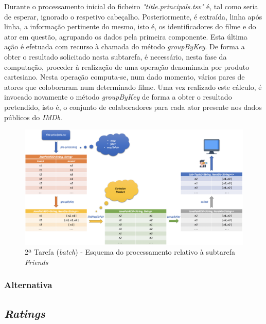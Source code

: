 \documentclass[a4paper]{report}
\begin{document}
            Durante o processamento inicial do ficheiro \textsl{"title.principals.tsv"} é, tal como seria de esperar, ignorado o respetivo cabeçalho.
            Posteriormente, é extraída, linha após linha, a informação pertinente do mesmo, isto é, os identificadores do filme e do ator em questão, agrupando os dados pela primeira componente. Esta última ação é efetuada com recurso à chamada do método \textit{groupByKey}.
            De forma a obter o resultado solicitado nesta subtarefa, é necessário, nesta fase da computação, proceder à realização de uma operação denominada por produto cartesiano. Nesta operação computa-se, num dado momento, vários pares de atores que coloboraram num determinado filme.
            Uma vez realizado este cálculo, é invocado novamente o método \textit{groupByKey} de forma a obter o resultado pretendido, isto é, o conjunto de colaboradores para cada ator presente nos dados públicos do \textit{IMDb}.

            \begin{figure}[H]
                \centering
                \includegraphics[width=1.0\textwidth]{Images/Task 2 - Friends.png}
                \caption{2ª Tarefa (\textit{batch}) - Esquema do processamento relativo à subtarefa \textit{Friends}}
                \label{fig:18}
            \end{figure}

            \subsubsection{Alternativa} \label{sssec:Task2-Friends-Alternativa}

        \subsection{\textit{Ratings}} \label{subsec:Task2-Ratings}
\end{document}
